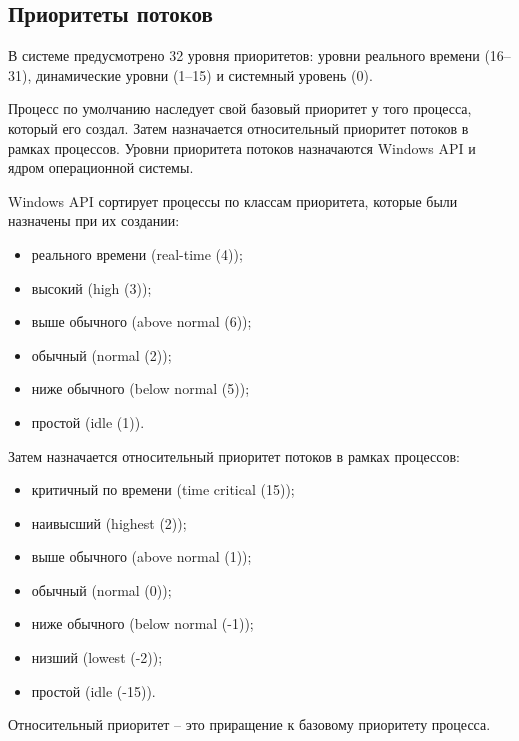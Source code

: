 \subsection{Приоритеты потоков}

В системе предусмотрено 32 уровня приоритетов: уровни реального времени (16--31), динамические уровни (1--15) и системный уровень (0). 

Процесс по умолчанию наследует свой базовый приоритет у того процесса, который его создал. Затем назначается относительный приоритет потоков в рамках процессов. Уровни приоритета потоков назначаются {\ttfamily Windows API} и ядром операционной системы.

{\ttfamily Windows API} сортирует процессы по классам приоритета, которые были назначены при их создании:
\begin{itemize}
	\item реального времени (real-time (4));
	\item высокий (high (3));
	\item выше обычного (above normal (6));
	\item обычный (normal (2));
	\item ниже обычного (below normal (5));
	\item простой (idle (1)).
\end{itemize}

Затем назначается относительный приоритет потоков в рамках процессов:
\begin{itemize}
	\item критичный по времени (time critical (15));
	\item наивысший (highest (2));
	\item выше обычного (above normal (1));
	\item обычный (normal (0));
	\item ниже обычного (below normal (-1));
	\item низший (lowest (-2));
	\item простой (idle (-15)).
\end{itemize}

Относительный приоритет -- это приращение к базовому приоритету процесса.

